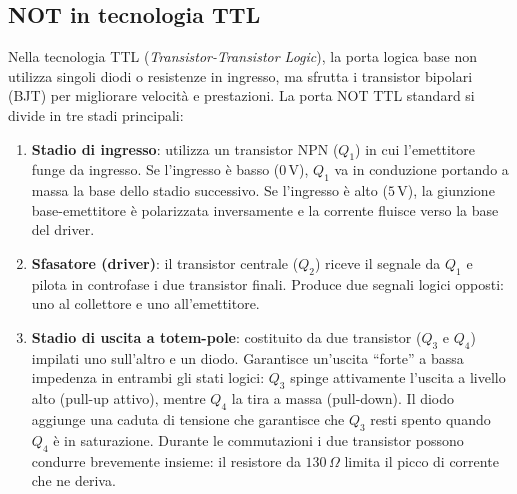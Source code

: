 \subsection{NOT in tecnologia TTL}

Nella tecnologia TTL (\emph{Transistor-Transistor Logic}), la porta logica base non utilizza singoli diodi o resistenze in ingresso, ma sfrutta i transistor bipolari (BJT) per migliorare velocità e prestazioni. La porta NOT TTL standard si divide in tre stadi principali:

\begin{enumerate}[leftmargin=1.5em]
    \item \textbf{Stadio di ingresso}: utilizza un transistor NPN ($Q_1$) in cui l'emettitore funge da ingresso. Se l'ingresso è basso ($0\,\mathrm{V}$), $Q_1$ va in conduzione portando a massa la base dello stadio successivo. Se l'ingresso è alto ($5\,\mathrm{V}$), la giunzione base-emettitore è polarizzata inversamente e la corrente fluisce verso la base del driver.
    \item \textbf{Sfasatore (driver)}: il transistor centrale ($Q_2$) riceve il segnale da $Q_1$ e pilota in controfase i due transistor finali. Produce due segnali logici opposti: uno al collettore e uno all'emettitore.
    \item \textbf{Stadio di uscita a totem-pole}: costituito da due transistor ($Q_3$ e $Q_4$) impilati uno sull'altro e un diodo. Garantisce un'uscita ``forte'' a bassa impedenza in entrambi gli stati logici: $Q_3$ spinge attivamente l'uscita a livello alto (pull-up attivo), mentre $Q_4$ la tira a massa (pull-down). Il diodo aggiunge una caduta di tensione che garantisce che $Q_3$ resti spento quando $Q_4$ è in saturazione. Durante le commutazioni i due transistor possono condurre brevemente insieme: il resistore da $130\,\Omega$ limita il picco di corrente che ne deriva.
\end{enumerate}

